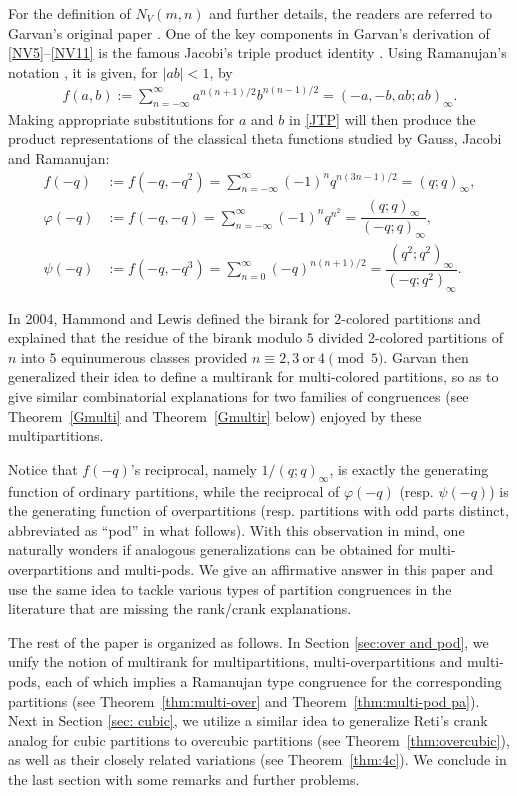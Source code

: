\documentclass[12pt]{amsart}
\numberwithin{equation}{section}
\theoremstyle{plain}
\theoremstyle{definition}
\begin{document}
For the definition of $N_V(m,n)$ and further details, the readers are referred to Garvan's original paper \cite{Gar}. One of the key components in Garvan's derivation of \eqref{NV5}--\eqref{NV11} is the famous Jacobi's triple product identity \cite[p.21, Theorem~2.8]{Andr1}. Using Ramanujan's notation \cite[p.6, Definition 1.2.1]{Ber}, it is given, for $|ab|<1$, by
\begin{align}
\label{JTP}f(a,b):=\sum_{n=-\infty}^{\infty}a^{n(n+1)/2}b^{n(n-1)/2}=(-a,-b,ab;ab)_{\infty}.
\end{align}
Making appropriate substitutions for $a$ and $b$ in \eqref{JTP} will then produce the product representations of the classical theta functions studied by Gauss, Jacobi and Ramanujan:
\begin{align}
\label{f}f(-q)&:=f(-q,-q^2)=\sum_{n=-\infty}^{\infty}(-1)^nq^{n(3n-1)/2}=(q;q)_{\infty},\\
\label{phi}\varphi(-q)&:=f(-q,-q)=\sum_{n=-\infty}^{\infty}(-1)^nq^{n^2}=\dfrac{(q;q)_{\infty}}{(-q;q)_{\infty}},\\
\label{psi}\psi(-q)&:=f(-q,-q^3)=\sum_{n=0}^{\infty}(-q)^{n(n+1)/2}=\dfrac{(q^2;q^2)_{\infty}}{(-q;q^2)_{\infty}}.
\end{align}

In 2004, Hammond and Lewis \cite{HL} defined the birank for $2$-colored partitions and explained that the residue of the birank modulo $5$ divided 2-colored partitions of $n$ into $5$ equinumerous classes provided $n\equiv2, 3~\textrm{or}~4\pmod{5}$. Garvan \cite{Gar2} then generalized their idea to define a multirank for multi-colored partitions, so as to give similar combinatorial explanations for two families of congruences (see Theorem~\ref{Gmulti} and Theorem~\ref{Gmultir} below) enjoyed by these multipartitions.

Notice that $f(-q)$'s reciprocal, namely $1/(q;q)_{\infty}$, is exactly the generating function of ordinary partitions, while the reciprocal of $\varphi(-q)$ (resp. $\psi(-q)$) is the generating function of overpartitions (resp. partitions with odd parts distinct, abbreviated as ``pod'' in what follows).  With this observation in mind, one naturally wonders if analogous generalizations can be obtained for multi-overpartitions and multi-pods. We give an affirmative answer in this paper and use the same idea to tackle various types of partition congruences in the literature that are missing the rank/crank explanations.

The rest of the paper is organized as follows. In Section \ref{sec:over and pod}, we unify the notion of multirank for multipartitions, multi-overpartitions and multi-pods, each of which implies a Ramanujan type congruence for the corresponding partitions (see Theorem~\ref{thm:multi-over} and Theorem~\ref{thm:multi-pod pa}). Next in Section \ref{sec: cubic}, we utilize a similar idea to generalize Reti's \cite{Ret} crank analog for cubic partitions to overcubic partitions (see Theorem~\ref{thm:overcubic}), as well as their closely related variations (see Theorem~\ref{thm:4c}). We conclude in the last section with some remarks and further problems.
\end{document}
